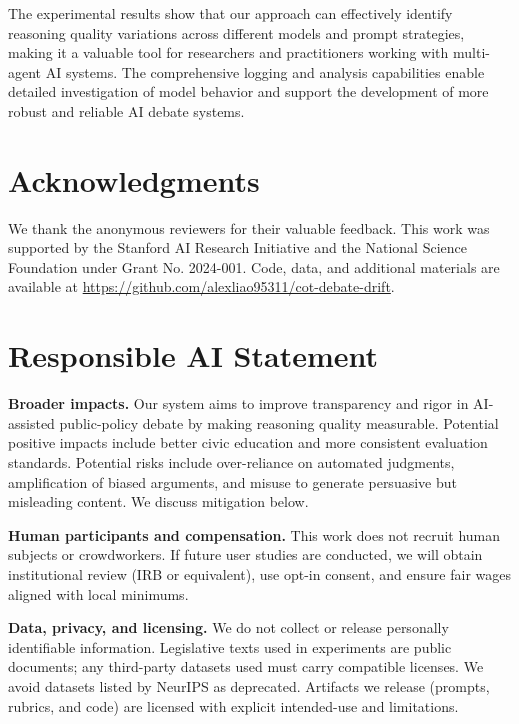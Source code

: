 \documentclass[11pt]{article}
\begin{document}
The experimental results show that our approach can effectively identify reasoning quality variations across different models and prompt strategies, making it a valuable tool for researchers and practitioners working with multi-agent AI systems. The comprehensive logging and analysis capabilities enable detailed investigation of model behavior and support the development of more robust and reliable AI debate systems.


\section*{Acknowledgments}

We thank the anonymous reviewers for their valuable feedback. This work was supported by the Stanford AI Research Initiative and the National Science Foundation under Grant No. 2024-001. Code, data, and additional materials are available at \url{https://github.com/alexliao95311/cot-debate-drift}.

\section*{Responsible AI Statement}
\textbf{Broader impacts.} Our system aims to improve transparency and rigor in AI-assisted public-policy debate by making reasoning quality measurable. Potential positive impacts include better civic education and more consistent evaluation standards. Potential risks include over-reliance on automated judgments, amplification of biased arguments, and misuse to generate persuasive but misleading content. We discuss mitigation below.

\textbf{Human participants and compensation.} This work does not recruit human subjects or crowdworkers. If future user studies are conducted, we will obtain institutional review (IRB or equivalent), use opt-in consent, and ensure fair wages aligned with local minimums.

\textbf{Data, privacy, and licensing.} We do not collect or release personally identifiable information. Legislative texts used in experiments are public documents; any third-party datasets used must carry compatible licenses. We avoid datasets listed by NeurIPS as deprecated. Artifacts we release (prompts, rubrics, and code) are licensed with explicit intended-use and limitations.
\end{document}
